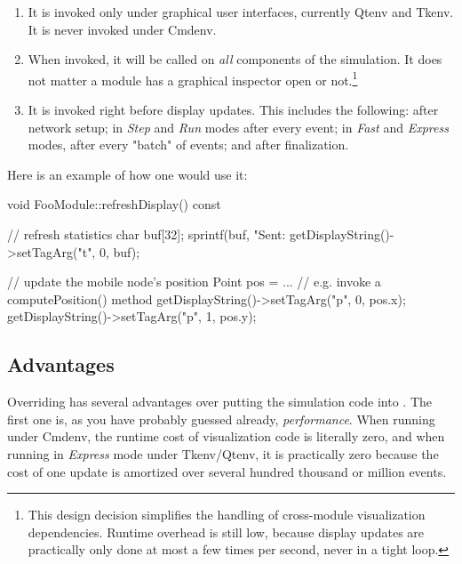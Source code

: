 \begin{enumerate}
\item It is invoked only under graphical user interfaces, currently Qtenv
     and Tkenv. It is never invoked under Cmdenv.

\item When invoked, it will be called on \textit{all} components of the
      simulation. It does not matter a module has a graphical inspector
      open or not.\footnote{This design decision simplifies the handling
      of cross-module visualization dependencies. Runtime overhead is
      still low, because display updates are practically only done at most
      a few times per second, never in a tight loop.}

\item It is invoked right before display updates. This includes the following:
      after network setup; in \textit{Step} and \textit{Run} modes after every event;
      in \textit{Fast} and \textit{Express} modes, after every "batch" of events;
      and after finalization.

\end{enumerate}

Here is an example of how one would use it:

\begin{cpp}
void FooModule::refreshDisplay() const
{
    // refresh statistics
    char buf[32];
    sprintf(buf, "Sent:%
    getDisplayString()->setTagArg("t", 0, buf);

    // update the mobile node's position
    Point pos = ...  // e.g. invoke a computePosition() method
    getDisplayString()->setTagArg("p", 0, pos.x);
    getDisplayString()->setTagArg("p", 1, pos.y);
}
\end{cpp}


\subsection{Advantages}

Overriding  has several advantages over putting the
simulation code into . The first one is, as you have
probably guessed already, \textit{performance}. When running under Cmdenv,
the runtime cost of visualization code is literally zero, and when running
in \textit{Express} mode under Tkenv/Qtenv, it is practically zero because
the cost of one update is amortized over several hundred thousand or
million events.

